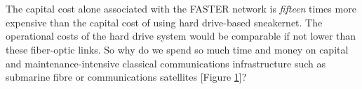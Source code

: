 \documentclass[aps,prl,twocolumn,10pt,nofootinbib]{revtex4}
\begin{document}
\\
\\
The capital cost alone associated with the FASTER network is {\em fifteen} times more expensive than the capital cost of using hard drive-based sneakernet. The operational costs of the hard drive system would be comparable if not lower than these fiber-optic links.  So why do we spend so much time and money on capital and maintenance-intensive classical communications infrastructure such as submarine fibre or communications satellites [Figure \ref{fig:classical}]?
\begin{figure}[ht!]
	\caption{}
	\label{fig:classical}
\end{figure}
\end{document}
